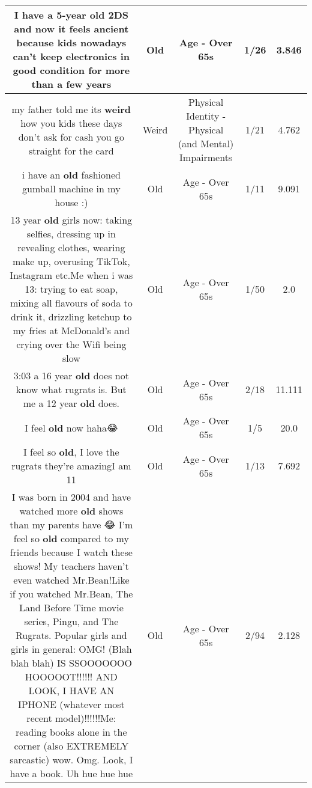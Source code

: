 \documentclass[11pt]{article}
\newlength\mylength
\begin{document}
\begin{center}
\begin{longtable}{|C{.65\mylength}|C{.30\mylength}|C{.12\mylength}|C{.12\mylength}|C{.12\mylength}|}
  \small I have a 5-year \textbf{old} 2DS and now it feels ancient because kids nowadays can't keep electronics in good condition for more than a few years\normalsize   & Old & Age - Over 65s & 1/26 & 3.846 \\  \hline
  \small my father told me its \textbf{weird} how you kids these days don't ask for cash you go straight for the card\normalsize   & Weird & Physical Identity - Physical (and Mental) Impairments & 1/21 & 4.762 \\  \hline
  \small i have an \textbf{old} fashioned gumball machine in my house :)\normalsize   & Old & Age - Over 65s & 1/11 & 9.091 \\  \hline
  \small 13 year \textbf{old} girls now: taking selfies, dressing up in revealing clothes, wearing make up, overusing TikTok, Instagram etc.Me when i was 13: trying to eat soap, mixing all flavours of soda to drink it, drizzling ketchup to my fries at McDonald's and crying over the Wifi being slow\normalsize   & Old & Age - Over 65s & 1/50 & 2.0 \\  \hline
  \small 3:03 a 16 year \textbf{old} does not know what rugrats is. But me a 12 year \textbf{old} does.\normalsize   & Old & Age - Over 65s & 2/18 & 11.111 \\  \hline
  \small I feel \textbf{old} now haha😂\normalsize   & Old & Age - Over 65s & 1/5 & 20.0 \\  \hline
  \small I feel so \textbf{old}, I love the rugrats they're amazingI am 11\normalsize   & Old & Age - Over 65s & 1/13 & 7.692 \\  \hline
  \small I was born in 2004 and have watched more \textbf{old} shows than my parents have 😂 I'm feel so \textbf{old} compared to my friends because I watch these shows! My teachers haven't even watched Mr.Bean!Like if you watched Mr.Bean, The Land Before Time movie series, Pingu, and The Rugrats. Popular girls and girls in general: OMG! (Blah blah blah) IS SSOOOOOOO HOOOOOT!!!!!! AND LOOK, I HAVE AN IPHONE (whatever most recent model)!!!!!!Me: reading books alone in the corner (also EXTREMELY sarcastic) wow. Omg. Look, I have a book. Uh hue hue hue\normalsize   & Old & Age - Over 65s & 2/94 & 2.128 \\  \hline

\end{longtable}
\end{center}
\end{document}
